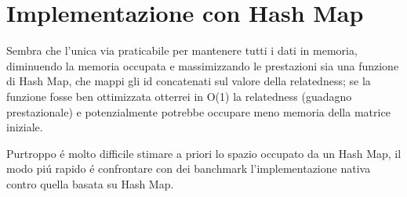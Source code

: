 \section{Implementazione con Hash Map}
Sembra che l'unica via praticabile per mantenere tutti i dati in memoria, diminuendo la memoria occupata e massimizzando le prestazioni sia una funzione di Hash Map, 
che mappi gli id concatenati sul valore della relatedness; se la funzione fosse ben ottimizzata otterrei in O(1) la relatedness (guadagno prestazionale)
e potenzialmente potrebbe occupare meno memoria della matrice iniziale.

Purtroppo \'e molto difficile stimare a priori lo spazio occupato da un Hash Map, 
il modo pi\'u rapido \'e confrontare con dei banchmark l'implementazione nativa contro quella basata su Hash Map.


